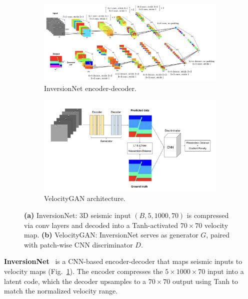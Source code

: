 \documentclass{article}
\begin{document}
\begin{figure}
    \centering
    \begin{subfigure}[b]{0.48\linewidth}
      \includegraphics[width=\linewidth]{figures/InversionNet.png}
      \caption{InversionNet encoder-decoder.}
      \label{fig:inversionnet_sub}
    \end{subfigure}
    \hfill
    \begin{subfigure}[b]{0.48\linewidth}
      \includegraphics[width=\linewidth]{figures/VelocityGAN.png}
      \caption{VelocityGAN architecture.}
      \label{fig:velocitygan_sub}
    \end{subfigure}
    \caption{\textbf{(a)} InversionNet: 3D seismic input \((B,5,1000,70)\) is compressed via conv layers and decoded into a Tanh-activated \(70\times70\) velocity map. 
    \textbf{(b)} VelocityGAN: InversionNet serves as generator \(G\), paired with patch-wise CNN discriminator \(D\).}
    \label{fig:inversion_velocitygan}
\end{figure}

\textbf{InversionNet}~\cite{inversionnet} is a CNN-based encoder-decoder that maps seismic inputs to velocity maps (Fig.~\ref{fig:inversionnet_sub}). The encoder compresses the \(5\times1000\times70\) input into a latent code, which the decoder upsamples to a \(70\times70\) output using Tanh to match the normalized velocity range.
\end{document}
